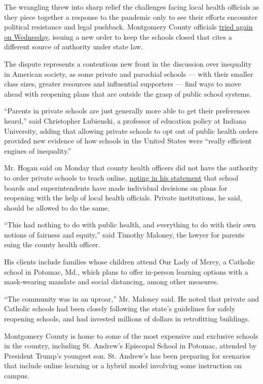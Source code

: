 The wrangling threw into sharp relief the challenges facing local health
officials as they piece together a response to the pandemic only to see
their efforts encounter political resistance and legal pushback.
Montgomery County officials
\href{https://www.baltimoresun.com/coronavirus/bs-md-elrich-hogan-schools-20200805-2k6mwqglknf7rhqfxecf2id64e-story.html}{tried
again on Wednesday}, issuing a new order to keep the schools closed that
cites a different source of authority under state law.

The dispute represents a contentious new front in the discussion over
inequality in American society, as some private and parochial schools
--- with their smaller class sizes, greater resources and influential
supporters --- find ways to move ahead with reopening plans that are
outside the grasp of public school systems.

``Parents in private schools are just generally more able to get their
preferences heard,'' said Christopher Lubienski, a professor of
education policy at Indiana University, adding that allowing private
schools to opt out of public health orders provided new evidence of how
schools in the United States were ``really efficient engines of
inequality.''

Mr. Hogan said on Monday that county health officers did not have the
authority to order private schools to teach online,
\href{https://twitter.com/GovLarryHogan/status/1290330304830246912/photo/1}{noting
in his statement} that school boards and superintendents have made
individual decisions on plans for reopening with the help of local
health officials. Private institutions, he said, should be allowed to do
the same.

``This had nothing to do with public health, and everything to do with
their own notions of fairness and equity,'' said Timothy Maloney, the
lawyer for parents suing the county health officer.

His clients include families whose children attend Our Lady of Mercy, a
Catholic school in Potomac, Md., which plans to offer in-person learning
options with a mask-wearing mandate and social distancing, among other
measures.

``The community was in an uproar,'' Mr. Maloney said. He noted that
private and Catholic schools had been closely following the state's
guidelines for safely reopening schools, and had invested millions of
dollars in retrofitting buildings.

Montgomery County is home to some of the most expensive and exclusive
schools in the country, including St. Andrew's Episcopal School in
Potomac, attended by President Trump's youngest son. St. Andrew's has
been preparing for scenarios that include online learning or a hybrid
model involving some instruction on campus.


